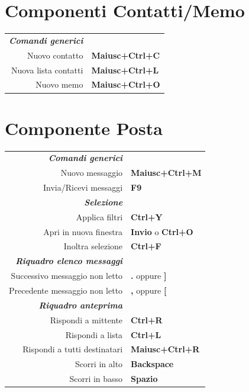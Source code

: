 \documentclass[12pt]{article}
\begin{document}
\begin{landscape}
\begin{center}
\begin{multicols}{2}
	\section*{Componenti Contatti/Memo}
	\begin{tabular*}{4in}{rp{1.5in}}
		\textit{\textbf{Comandi generici}}	&					\\
		Nuovo contatto				& \textbf{Maiusc+Ctrl+C}			\\
		Nuova lista contatti			& \textbf{Maiusc+Ctrl+L}			\\
		Nuovo memo				& \textbf{Maiusc+Ctrl+O}			\\
	\end{tabular*}
	\section*{Componente Posta}
	\begin{tabular*}{4in}{rp{1.5in}}
		\textit{\textbf{Comandi generici}}	&					\\
		Nuovo messaggio				& \textbf{Maiusc+Ctrl+M}			\\
		\vspace{1.5mm}
		Invia/Ricevi messaggi			& \textbf{F9}				\\
		\textit{\textbf{Selezione}}		&					\\
		Applica filtri				& \textbf{Ctrl+Y}			\\
		Apri in nuova finestra 			& \textbf{Invio} o \textbf{Ctrl+O}	\\
		\vspace{1.5mm}
		Inoltra selezione			& \textbf{Ctrl+F}			\\
		\textit{\textbf{Riquadro elenco messaggi}}	&					\\
		Successivo messaggio non letto		& \textbf{.} oppure \textbf{]}		\\
		\vspace{1.5mm}
		Precedente messaggio non letto		& \textbf{,} oppure \textbf{[}		\\
		\textit{\textbf{Riquadro anteprima}}	&					\\
		Rispondi a mittente			& \textbf{Ctrl+R}			\\
		Rispondi a lista			& \textbf{Ctrl+L}			\\
		Rispondi a tutti destinatari 		& \textbf{Maiusc+Ctrl+R}			\\
		Scorri in alto				& \textbf{Backspace}			\\
		Scorri in basso				& \textbf{Spazio}			\\
	\end{tabular*}

\end{multicols}
\end{center}
\end{landscape}
\end{document}
